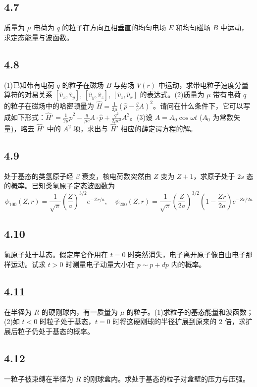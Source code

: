 \subsection{4.7}
质量为 $\mu$ 电荷为 $q$ 的粒子在方向互相垂直的均匀电场 $E$ 和均匀磁场 $B$ 中运动，求定态能量与波函数。

\subsection{4.8}
(1)已知带有电荷 $q$ 的粒子在磁场 $B$ 与势场 $V(r)$ 中运动，求带电粒子速度分量算符的对易关系 $[\hat{v}_x, \hat{v}_y]$, $[\hat{v}_y, \hat{v}_z]$, $[\hat{v}_z, \hat{v}_x]$ 的表达式。(2)质量为 $\mu$ 带有电荷 $q$ 的粒子在磁场中的哈密顿量为 $\hat{H} = \frac{1}{2 \mu} \left( \hat{p} - \frac{q}{c} A \right)^2$。请问在什么条件下，它可以写成如下形式：$\hat{H}' = \frac{1}{2 \mu} \hat{p}^2 - \frac{q}{\mu c} A \cdot \hat{p} + \frac{q^2}{2 \mu c^2} A^2$。(3)设 $A = A_0 \cos \omega t$ ($A_0$ 为常数矢量)，略去 $\hat{H}'$ 中的 $A^2$ 项，求出与 $\hat{H}'$ 相应的薛定谔方程的解。

\subsection{4.9}
处于基态的类氢原子经 $\beta$ 衰变，核电荷数突然由 $Z$ 变为 $Z+1$，求原子处于 $2s$ 态的概率。已知类氢原子定态波函数为
$$ \psi_{100}(Z,r) = \frac{1}{\sqrt{\pi}} \left( \frac{Z}{a} \right)^{3/2} e^{-Zr/a}, \quad \psi_{200}(Z,r) = \frac{1}{\sqrt{\pi}} \left( \frac{Z}{2a} \right)^{3/2} \left( 1 - \frac{Zr}{2a} \right) e^{-Zr/2a} $$

\subsection{4.10}
氢原子处于基态。假定库仑作用在 $t=0$ 时突然消失，电子离开原子像自由电子那样运动。试求 $t>0$ 时测量电子动量大小在 $p\sim p+dp$ 内的概率。

\subsection{4.11}
在半径为 $ R $ 的硬刚球内，有一质量为 $ \mu $ 的粒子。(1)求粒子的基态能量和波函数；(2)如 $ t < 0 $ 时粒子处于基态，$ t = 0 $ 时将这硬刚球的半径扩展到原来的 2 倍，求扩展后粒子仍处于基态的概率。

\subsection{4.12}
一粒子被束缚在半径为 $ R $ 的刚球盒内。求处于基态的粒子对盒壁的压力与压强。

